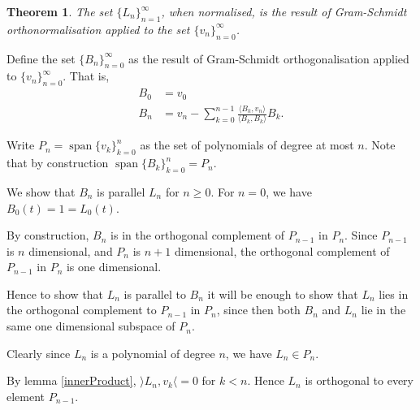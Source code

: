 \documentclass[10pt]{article}
\newtheorem{theorem}{Theorem}
\newenvironment{proof}[1][Proof]{\begin{trivlist}
\item[\hskip \labelsep {\bfseries #1}]}{\end{trivlist}}
\newcommand{\Span}{\operatorname{span}}
\begin{document}
        \begin{theorem}
            The set $\{L_n\}_{n=1}^\infty$, when normalised, is the result of Gram-Schmidt orthonormalisation
            applied to the set $\{v_n\}_{n=0}^\infty$. 
        \end{theorem}
        \begin{proof}
            Define the set $\{B_n\}_{n=0}^\infty$ as the result of Gram-Schmidt orthogonalisation
            applied to $\{v_n\}_{n=0}^\infty$. That is,
            \begin{align*}
                B_0 &= v_0\\
                B_n &= v_n-\sum_{k=0}^{n-1} \frac{\langle B_k,v_n\rangle}{\langle B_k,B_k\rangle} B_k.
            \end{align*}
            
            Write $P_n = \Span\{v_k\}_{k=0}^n$ as the set of
            polynomials of degree at most $n$. Note that by construction $\Span\{B_k\}_{k=0}^n = P_n$.
            
            We show that $B_n$ is parallel $L_n$ for $n\geq 0$. For $n = 0$, we
            have $B_0(t) = 1 = L_0(t)$.
                        
            By construction, $B_n$ is in the orthogonal complement of $P_{n-1}$
            in $P_n$. Since $P_{n-1}$ is $n$ dimensional, and $P_n$ is $n+1$
            dimensional, the orthogonal complement of $P_{n-1}$
            in $P_n$ is one dimensional.
            
            Hence to show that $L_n$ is parallel
            to $B_n$ it will be enough to show that $L_n$ lies
            in the orthogonal complement to $P_{n-1}$ in $P_n$, since then
            both $B_n$ and $L_n$ lie in the same one dimensional subspace of $P_n$.
            
            Clearly since $L_n$ is a polynomial of degree $n$, we have $L_n\in P_n$. 
            
            By lemma \ref{innerProduct}, $\rangle L_n,v_k\langle = 0$ for $k < n$.
            Hence $L_n$ is orthogonal to every element $P_{n-1}$. 
            
            
            
            
            

\end{proof}
\end{document}
